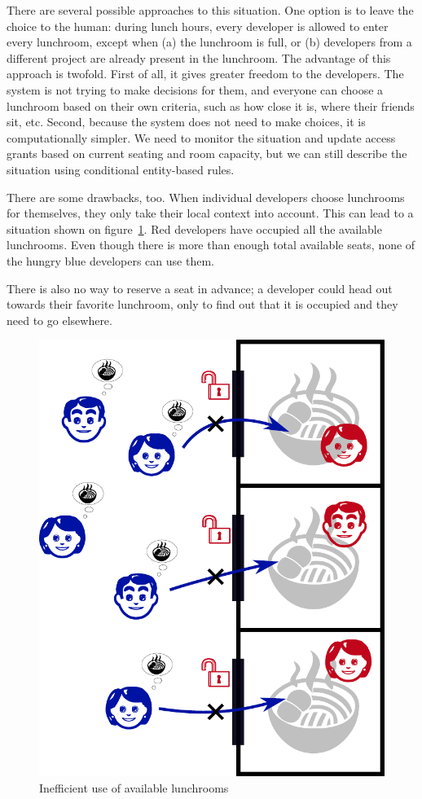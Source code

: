 \medskip

There are several possible approaches to this situation. One option is to leave the
choice to the human: during lunch hours, every developer is allowed to enter every
lunchroom, except when (a) the lunchroom is full, or (b) developers from a different
project are already present in the lunchroom. The advantage of this approach is twofold.
First of all, it gives greater freedom to the developers. The system is not trying to
make decisions for them, and everyone can choose a lunchroom based on their own
criteria, such as how close it is, where their friends sit, etc. Second, because the
system does not need to make choices, it is computationally simpler. We need to monitor
the situation and update access grants based on current seating and room capacity, but
we can still describe the situation using conditional entity-based rules.

There are some drawbacks, too. When individual developers choose lunchrooms for
themselves, they only take their local context into account. This can lead to a
situation shown on figure~\ref{fig:lunch-inefficient}. Red developers have occupied
all the available lunchrooms. Even though there is more than enough total available
seats, none of the hungry blue developers can use them.

There is also no way to reserve a seat in advance; a developer could head out towards
their favorite lunchroom, only to find out that it is occupied and they need to go
elsewhere.

\begin{figure}[ht]
    \centering
    \includegraphics[width=0.67\linewidth]{img/lunch-inefficient.pdf}
    \caption{Inefficient use of available lunchrooms}
    \label{fig:lunch-inefficient}
\end{figure}

